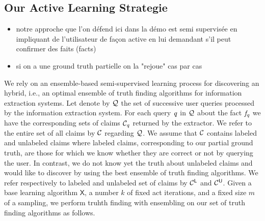 

\subsection{Our Active Learning Strategie}
\begin{itemize}
 \item notre approche que l'on défend ici dans la démo est  semi supervisée en impliquant de l'utilisateur de façon active
en lui demandant s'il peut confirmer des faits (facts)
\item si on a une ground truth partielle on la "rejoue" cas par cas
\end{itemize}

\medskip

We rely on an ensemble-based semi-supervised learning process for discovering an hybrid, i.e., an optimal ensemble of truth
finding algorithms for information extraction systems. Let denote by $\mathcal{Q}$ the set of successive user queries processed 
by the information extraction system. For each query $\mathit{q}$ in $\mathcal{Q}$ about the fact $\mathit{f}_{\mathit{q}}$ we have the corresponding
sets of claims $\mathcal{C}_{\mathit{q}}$ returned by the extractor. We refer to the entire set of all claims by $\mathcal{C}$ regarding $\mathcal{Q}$.
We assume that $\mathcal{C}$ contains labeled and unlabeled claims where labeled claims, corresponding to our partial ground truth, are those 
for which we  know whether they are correct or not by querying the user. In contrast, we do not know yet the truth about unlabeled claims and
would like to discover by using the best ensemble of truth finding algorithms. We refer respectively to labeled and unlabeled set of claims by 
$\mathcal{C}^{\mathsf{L}}$ and $\mathcal{C}^{\mathsf{U}}$. Given a base learning algorithm $\mathsf{X}$, a number $k$ of fixed act iterations, and 
a fixed size $m$ of a sampling, we perform truhth finding with ensembling on our set of truth finding algorithms as follows.

